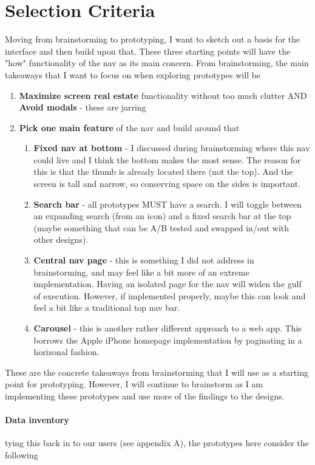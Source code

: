\section{Selection Criteria}
Moving from brainstorming to prototyping, I want to sketch out a basis for the interface and then build upon that. These three starting points will have the "how" functionality of the nav as its main concern. From brainstorming, the main takeaways that I want to focus on when exploring prototypes will be

\begin{enumerate}
\item
  \textbf{Maximize screen real estate} functionality without too much clutter AND \textbf{Avoid modals} - these are jarring
\item
  \textbf{Pick one main feature} of the nav and build around that
  \begin{enumerate}
  \item
    \textbf{Fixed nav at bottom} - I discussed during brainstorming where this nav could live and I think the bottom makes the most sense. The reason for this is that the thumb is already located there (not the top). And the screen is tall and narrow, so conserving space on the sides is important.
  \item
    \textbf{Search bar} - all prototypes MUST have a search. I will toggle between an expanding search (from an icon) and a fixed search bar at the top (maybe something that can be A/B tested and swapped in/out with other designs).
  \item
    \textbf{Central nav page} - this is something I did not address in brainstorming, and may feel like a bit more of an extreme implementation. Having an isolated page for the nav will widen the gulf of execution. However, if implemented properly, maybe this can look and feel a bit like a traditional top nav bar.
  \item
    \textbf{Carousel} - this is another rather different approach to a web app. This borrows the Apple iPhone homepage implementation by paginating in a horizonal fashion.
  \end{enumerate}
\end{enumerate}

These are the concrete takeaways from brainstorming that I will use as a starting point for prototyping. However, I will continue to brainstorm as I am implementing these  prototypes and use more of the findings to the designs.

\paragraph{Data inventory} tying this back in to our users (see appendix A), the prototypes here consider the following

